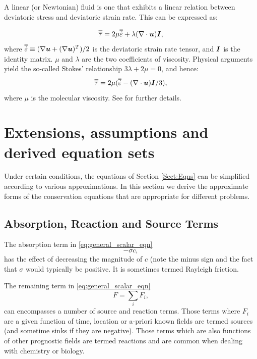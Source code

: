 A linear (or Newtonian) fluid is one that exhibits a linear relation between deviatoric stress and deviatoric strain rate. This can be expressed as: 

\begin{equation}
\overline{\overline{\tau}} = 2\mu \overline{\overline{\dot{\varepsilon}}} + \lambda(\nabla\cdot{\mbox{\boldmath$u$}}){\mbox{\boldmath$I$}},
\end{equation}
where $\overline{\overline{\dot{\varepsilon}}} \equiv(\nabla{\mbox{\boldmath$u$}} + (\nabla{\mbox{\boldmath$u$}})^T)/2$ is the
deviatoric strain rate tensor, and ${\mbox{\boldmath$I$}}$ is the identity matrix. $\mu$ and
$\lambda$ are the two coefficients of viscosity. Physical arguments
yield the so-called Stokes' relationship $3\lambda+2\mu=0$, and
hence:
\begin{equation}
\overline{\overline{\tau}} = 2\mu(\overline{\overline{\dot{\varepsilon}}} - (\nabla\cdot{\mbox{\boldmath$u$}}){\mbox{\boldmath$I$}}/3),
\end{equation}
where $\mu$ is the molecular viscosity. See \cite{batchelor1967} for further
details.

\section{Extensions, assumptions and derived equation sets}\label{sect:eqn_extensions}
Under certain conditions, the equations of Section \ref{Sect:Eqns} can be simplified according to various approximations. In this section we derive the approximate forms of the conservation equations that are appropriate for different problems. 

\subsection{Absorption, Reaction and Source Terms}
The absorption term in \eqref{eq:general_scalar_eqn} 
\begin{equation}\label{eq:scalar_absorption}
-\sigma c,
\end{equation}
has the effect of decreasing the magnitude of $c$ (note the minus sign and the fact 
that $\sigma$ would typically be positive. It is sometimes termed Rayleigh friction. 

The remaining term in \eqref{eq:general_scalar_eqn}
\begin{equation}\label{eq:scalar_source}
F = \sum_i F_i,
\end{equation}
can encompasses a number of source and reaction terms. Those terms where $F_i$ are
a given function of time, location or a-priori known fields are termed sources (and sometime
sinks if they are negative). Those terms which are also functions of other prognostic fields
are termed reactions and are common when dealing with chemistry or biology.

